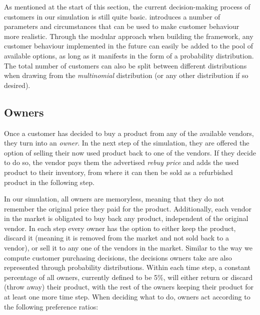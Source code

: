 As mentioned at the start of this section, the current decision-making process of customers in our simulation is still quite basic.  introduces a number of parameters and circumstances that can be used to make customer behaviour more realistic. Through the modular approach when building the framework, any customer behaviour implemented in the future can easily be added to the pool of available options, as long as it manifests in the form of a probability distribution. The total number of customers can also be split between different distributions when drawing from the \emph{multinomial} distribution (or any other distribution if so desired).

\subsection{Owners}

Once a customer has decided to buy a product from any of the available vendors, they turn into an \emph{owner}. In the next step of the simulation, they are offered the option of selling their now used product back to one of the vendors. If they decide to do so, the vendor pays them the advertised \emph{rebuy price} and adds the used product to their inventory, from where it can then be sold as a refurbished product in the following step.

In our simulation, all owners are memoryless, meaning that they do not remember the original price they paid for the product. Additionally, each vendor in the market is obligated to buy back any product, independent of the original vendor. In each step every owner has the option to either keep the product, discard it (meaning it is removed from the market and not sold back to a vendor), or sell it to any one of the vendors in the market. Similar to the way we compute customer purchasing decisions, the decisions owners take are also represented through probability distributions. Within each time step, a constant percentage of all owners, currently defined to be 5\%, will either return or discard (throw away) their product, with the rest of the owners keeping their product for at least one more time step. When deciding what to do, owners act according to the following preference ratios:


